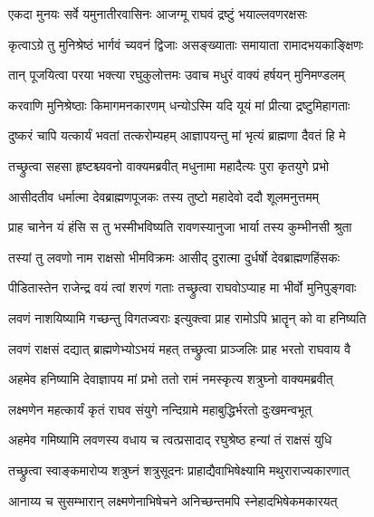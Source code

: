 

\twolineshloka
{एकदा मुनयः सर्वे यमुनातीरवासिनः}
{आजग्मू राघवं द्रष्टुं भयाल्लवणरक्षसः} %

\twolineshloka
{कृत्वाऽग्रे तु मुनिश्रेष्ठं भार्गवं च्यवनं द्विजाः}
{असङ्ख्याताः समायाता रामादभयकाङ्क्षिणः} %

\twolineshloka
{तान् पूजयित्वा परया भक्त्या रघुकुलोत्तमः}
{उवाच मधुरं वाक्यं हर्षयन् मुनिमण्डलम्} %

\twolineshloka
{करवाणि मुनिश्रेष्ठाः किमागमनकारणम्}
{धन्योऽस्मि यदि यूयं मां प्रीत्या द्रष्टुमिहागताः} %

\twolineshloka
{दुष्करं चापि यत्कार्यं भवतां तत्करोम्यहम्}
{आज्ञापयन्तु मां भृत्यं ब्राह्मणा दैवतं हि मे} %

\twolineshloka
{तच्छ्रुत्वा सहसा हृष्टश्च्यवनो वाक्यमब्रवीत्}
{मधुनामा महादैत्यः पुरा कृतयुगे प्रभो} %

\twolineshloka
{आसीदतीव धर्मात्मा देवब्राह्मणपूजकः}
{तस्य तुष्टो महादेवो ददौ शूलमनुत्तमम्} %

\twolineshloka
{प्राह चानेन यं हंसि स तु भस्मीभविष्यति}
{रावणस्यानुजा भार्या तस्य कुम्भीनसी श्रुता} %

\twolineshloka
{तस्यां तु लवणो नाम राक्षसो भीमविक्रमः}
{आसीद् दुरात्मा दुर्धर्षो देवब्राह्मणहिंसकः} %

\twolineshloka
{पीडितास्तेन राजेन्द्र वयं त्वां शरणं गताः}
{तच्छ्रुत्वा राघवोऽप्याह मा भीर्वो मुनिपुङ्गवाः} %

\twolineshloka
{लवणं नाशयिष्यामि गच्छन्तु विगतज्वराः}
{इत्युक्त्वा प्राह रामोऽपि भ्रातॄन् को वा हनिष्यति} %

\twolineshloka
{लवणं राक्षसं दद्यात् ब्राह्मणेभ्योऽभयं महत्}
{तच्छ्रुत्वा प्राञ्जलिः प्राह भरतो राघवाय वै} %

\twolineshloka
{अहमेव हनिष्यामि देवाज्ञापय मां प्रभो}
{ततो रामं नमस्कृत्य शत्रुघ्नो वाक्यमब्रवीत्} %

\twolineshloka
{लक्ष्मणेन महत्कार्यं कृतं राघव संयुगे}
{नन्दिग्रामे महाबुद्धिर्भरतो दुःखमन्वभूत्} %

\twolineshloka
{अहमेव गमिष्यामि लवणस्य वधाय च}
{त्वत्प्रसादाद् रघुश्रेष्ठ हन्यां तं राक्षसं युधि} %

\twolineshloka
{तच्छ्रुत्वा स्वाङ्कमारोप्य शत्रुघ्नं शत्रुसूदनः}
{प्राहाद्यैवाभिषेक्ष्यामि मथुराराज्यकारणात्} %

\twolineshloka
{आनाय्य च सुसम्भारान् लक्ष्मणेनाभिषेचने}
{अनिच्छन्तमपि स्नेहादभिषेकमकारयत्} %

